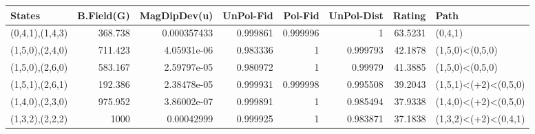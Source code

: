 \begin{tabular}{lrrrrrrl}
\hline
 States          &   B.Field(G) &   MagDipDev(u) &   UnPol-Fid &   Pol-Fid &   UnPol-Dist &   Rating & Path                 \\
\hline
 (0,4,1),(1,4,3) &      368.738 &    0.000357433 &    0.999861 &  0.999996 &     1        &  63.5231 & (0,4,1)              \\
 (1,5,0),(2,4,0) &      711.423 &    4.05931e-06 &    0.983336 &  1        &     0.999793 &  42.1878 & (1,5,0)<(0,5,0)      \\
 (1,5,0),(2,6,0) &      583.167 &    2.59797e-05 &    0.980972 &  1        &     0.99979  &  41.3885 & (1,5,0)<(0,5,0)      \\
 (1,5,1),(2,6,1) &      192.386 &    2.38478e-05 &    0.999931 &  0.999998 &     0.995508 &  39.2043 & (1,5,1)<(+2)<(0,5,0) \\
 (1,4,0),(2,3,0) &      975.952 &    3.86002e-07 &    0.999891 &  1        &     0.985494 &  37.9338 & (1,4,0)<(+2)<(0,5,0) \\
 (1,3,2),(2,2,2) &     1000     &    0.00042999  &    0.999925 &  1        &     0.983871 &  37.1838 & (1,3,2)<(+2)<(0,4,1) \\
\hline
\end{tabular}